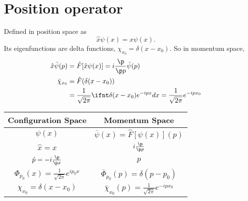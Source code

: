 \documentclass[cplx.tex]{subfiles}
\begin{document}
\section{Position operator}
Defined in position space as
\begin{equation}
    \hat{x}\psi(x) = x\psi(x).
\end{equation}
Its eigenfunctions are delta functions, $\chi_{x_0} = \delta(x-x_0)$.
So in momentum space, 
\begin{align}
    \hat{x}\bar{\psi}(p) &= \hat{F}[\hat{x}\psi(x)] = i\frac{\p}{\p p}\bar{\psi}(p) \\
    \bar{\chi}_{x_0} &= \hat{F}(\delta(x-x_0)) \\
                     &= \frac{1}{\sqrt{2\pi}} \ifnt \delta(x-x_0)e^{-ipx} dx = \frac{1}{\sqrt{2\pi}} e^{-ipx_0}
\end{align}
\begin{center}
    \begin{tabular}{c|c}
        Configuration Space & Momentum Space \\
        \hline
        $\psi(x)$ & $\bar{\psi}(x) = \hat{F}[\psi(x)](p)$ \\
        $\hat{x} = x$ & $i\frac{\p}{\p p}$ \\
        $\hat{p} = -i\frac{\p}{\p x}$ & $p$ \\
        $\Phi_{p_0}(x) = \frac{1}{\sqrt{2\pi}}e^{ip_0 x}$ & $\bar{\Phi}_{p_0}(p) = \delta(p-p_0)$ \\
        $\chi_{x_0} = \delta(x-x_0)$ & $\bar{\chi}_{x_0}(p) = \frac{1}{\sqrt{2\pi}}e^{-ipx_0}$
    \end{tabular}
\end{center}
\end{document}
